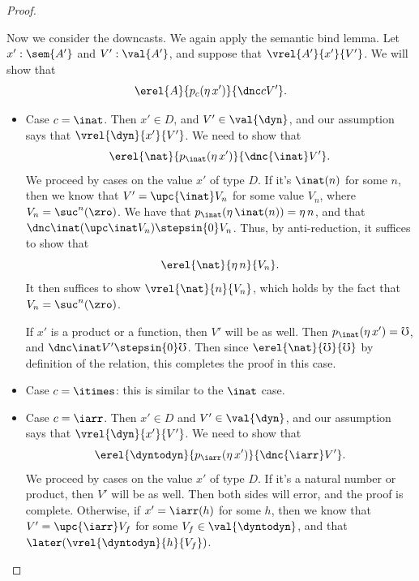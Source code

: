 \begin{proof}
\begin{itemize}
        
    \end{itemize}

    Now we consider the downcasts. We again apply the semantic bind lemma. Let
    $x' : \sem{A'}$ and $V' : \val{A'}$, and suppose that $\vrel{A'}{x'}{V'}$.
    We will show that
    \[ \erel{A}{p_c(\eta\, x')} {\dnc c V'}.  \]

    \begin{itemize}
        \item Case $c = \inat$. Then $x' \in D$, and $V' \in \val{\dyn}$, and our
        assumption says that $\vrel{\dyn}{x'}{V'}$. We need to show that
        \[ \erel {\nat} {p_{\inat}(\eta\, x')} {\dnc {\inat} V'}.  \]
        We proceed by cases on the value $x'$ of type $D$. If it's $\inat(n)$
        for some $n$, then we know that $V' = \upc {\inat} V_n$ for some value
        $V_n$, where $V_n = \suc^n(\zro)$.
        We have that $p_{\inat}(\eta\, \inat(n)) = \eta\, n$, and that $\dnc
        \inat (\upc \inat V_n) \stepsin{0} V_n$. Thus, by anti-reduction, it
        suffices to show that
        \[ \erel {\nat} {\eta\, n} {V_n}. \]
        It then suffices to show $\vrel{\nat}{n}{V_n}$, which holds by the fact
        that $V_n = \suc^n(\zro)$.

        If $x'$ is a product or a function, then $V'$ will be as well. Then
        $p_{\inat}(\eta\, x') = \mho$, and $\dnc \inat V' \stepsin{0} \mho$.
        Then since $\erel{\nat}{\mho}{\mho}$ by definition of the relation, this
        completes the proof in this case.

        \item Case $c = \itimes$: this is similar to the $\inat$ case.
        
        \item Case $c = \iarr$. Then $x' \in D$ and $V' \in \val{\dyn}$, and our
        assumption says that $\vrel{\dyn}{x'}{V'}$. We need to show that
        \[ \erel {\dyntodyn} {p_{\iarr}(\eta\, x')} {\dnc {\iarr} V'}. \]
        We proceed by cases on the value $x'$ of type $D$. If it's a natural
        number or product, then $V'$ will be as well. Then both sides will
        error, and the proof is complete.
        Otherwise, if $x' = \iarr(h)$ for some $h$, then we know that $V' = \upc
        {\iarr} V_f$ for some $V_f \in \val{\dyntodyn}$, and that $\later (\vrel{\dyntodyn}{h}{V_f})$.


\end{itemize}
\end{proof}
